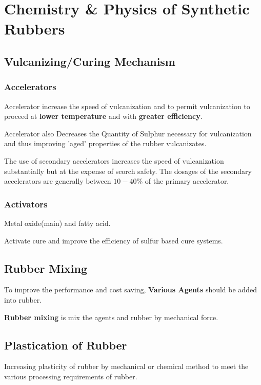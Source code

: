 \documentclass{NoteThesis/note-thesis}
\begin{document}
\section{Chemistry \& Physics of Synthetic Rubbers}

\subsection{Vulcanizing/Curing Mechanism}


\subsubsection*{Accelerators}

Accelerator increase the speed of vulcanization and to permit vulcanization to proceed at \textbf{lower temperature} and with \textbf{greater efficiency}.

Accelerator also Decreases the Quantity of Sulphur necessary for vulcanization and thus improving 'aged' properties of the rubber vulcanizates.

The use of secondary accelerators increases the speed of vulcanization substantially but at the expense of scorch safety. The dosages of the secondary accelerators are generally between $10-40\%$ of the primary accelerator.

\subsubsection*{Activators}

Metal oxide(main) and fatty acid.

Activate cure and improve the efficiency of sulfur based cure systems.

\subsection{Rubber Mixing}

To improve the performance and cost saving, \textbf{Various Agents} should be added into rubber.

\textbf{Rubber mixing} is mix the agents and rubber by mechanical force.

\subsection{Plastication of Rubber}

Increasing plasticity of rubber by mechanical or chemical method to meet the various processing requirements of rubber.
\end{document}
